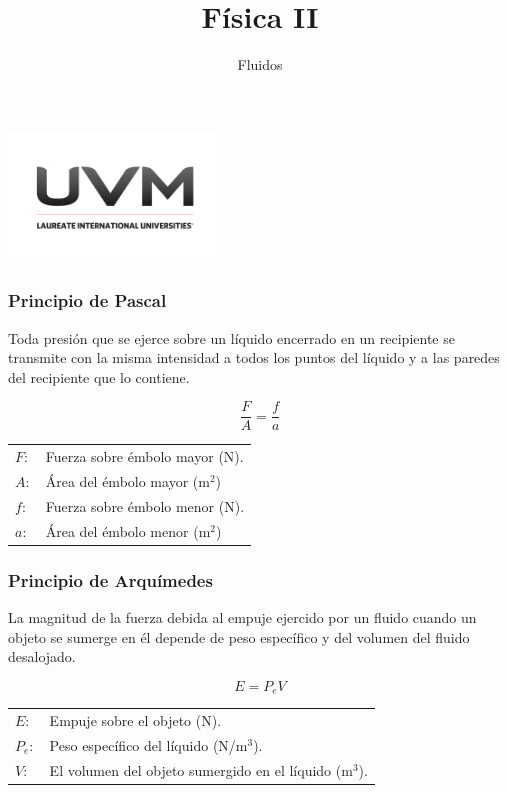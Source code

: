 \documentclass[handout]{beamer}
\title{Física II}
\author{Fluidos}
\institute[UVM]{4\textdegree \hspace{2pt} cuatrimestre.}
\begin{document}
\begin{frame}[noframenumbering]
  \titlepage
  \begin{center}
    \includegraphics[width=5.5cm]{uvm1}    
  \end{center}  
\end{frame}


\begin{frame}
  \frametitle{Principio de Pascal}
  \begin{block}{}
    Toda presión que se ejerce sobre un líquido encerrado en un recipiente se transmite
    con la misma intensidad a todos los puntos del líquido y a las paredes del recipiente
    que lo contiene.
  \end{block}
  
  {\huge \[\frac{F}{A} = \frac{f}{a}\]}
  
  \begin{tabular}{ll}
    $F:$ & Fuerza sobre émbolo mayor (N).  \\ 
    $A:$ & Área del émbolo mayor (m$^2$) \\ 
    $f:$ & Fuerza sobre émbolo menor (N). \\
    $a:$ & Área del émbolo menor (m$^2$) \\
  \end{tabular}
\end{frame}



\begin{frame}
  \frametitle{Principio de Arquímedes}
  \begin{block}{}
    La magnitud de la fuerza debida al empuje ejercido por un fluido cuando un objeto se
    sumerge en él depende de peso específico y del volumen del fluido desalojado.   
  \end{block}
  {\huge \[E = P_{e}V\]}
  
  \begin{tabular}{ll}
    $E:$ & Empuje sobre el objeto (N).  \\ 
    $P_{e}:$ & Peso específico del líquido (N/m$^3$). \\ 
    $V:$ & El volumen del objeto sumergido en el líquido (m$^3$). \\
  \end{tabular}
\end{frame}
\end{document}
